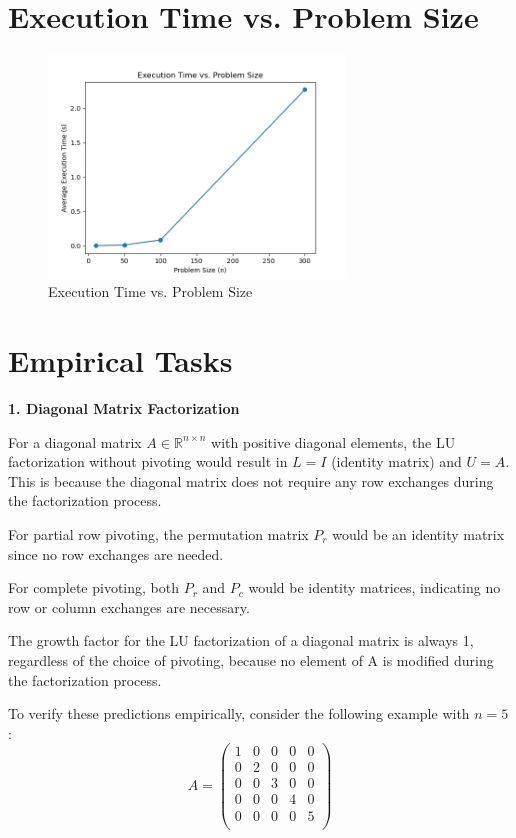 \documentclass{article}
\begin{document}
\section{Execution Time vs. Problem Size}
\begin{figure}[H]
    \centering
    \includegraphics[width=0.7\textwidth]{ex_time.png}
    \caption{Execution Time vs. Problem Size}
\end{figure}

\section{Empirical Tasks}

\textbf{1. Diagonal Matrix Factorization}

For a diagonal matrix \( A \in \mathbb{R}^{n \times n} \) with positive diagonal elements, the LU factorization without pivoting would result in \( L = I \) (identity matrix) and \( U = A \). This is because the diagonal matrix does not require any row exchanges during the factorization process. 

For partial row pivoting, the permutation matrix \( P_r \) would be an identity matrix since no row exchanges are needed. 

For complete pivoting, both \( P_r \) and \( P_c \) would be identity matrices, indicating no row or column exchanges are necessary.

The growth factor for the LU factorization of a diagonal matrix is always 1, regardless of the choice of pivoting, because no element of A is modified during the factorization process.

To verify these predictions empirically, consider the following example with \( n = 5 \):
\[
A =
\begin{pmatrix}
1 & 0 & 0 & 0 & 0 \\
0 & 2 & 0 & 0 & 0 \\
0 & 0 & 3 & 0 & 0 \\
0 & 0 & 0 & 4 & 0 \\
0 & 0 & 0 & 0 & 5 \\
\end{pmatrix}
\]
\end{document}
